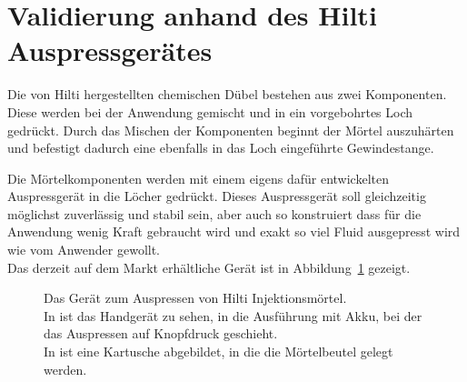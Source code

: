 \section{Validierung anhand des Hilti Auspressgerätes}
\label{Kapitel:Auspressgeraet}
Die von Hilti hergestellten chemischen Dübel bestehen aus zwei Komponenten. Diese werden bei der Anwendung gemischt und in ein vorgebohrtes Loch gedrückt. Durch das Mischen der Komponenten beginnt der Mörtel auszuhärten und befestigt dadurch eine ebenfalls in das Loch eingeführte Gewindestange.

Die Mörtelkomponenten werden mit einem eigens dafür entwickelten Auspressgerät in die Löcher gedrückt. Dieses Auspressgerät soll gleichzeitig möglichst zuverlässig und stabil sein, aber auch so konstruiert dass für die Anwendung wenig Kraft gebraucht wird und exakt so viel Fluid ausgepresst wird wie vom Anwender gewollt.\\
Das derzeit auf dem Markt erhältliche Gerät ist in Abbildung~\ref{fig:Auspressgeraet} gezeigt.
%
\begin{figure}[b]
    \centering
    \caption{Das Gerät zum Auspressen von Hilti Injektionsmörtel.\\In {} ist das Handgerät zu sehen, in  die Ausführung mit Akku, bei der das Auspressen auf Knopfdruck geschieht.\\
    In  ist eine Kartusche abgebildet, in die die Mörtelbeutel gelegt werden.}
    \label{fig:Auspressgeraet}
\end{figure}
%

